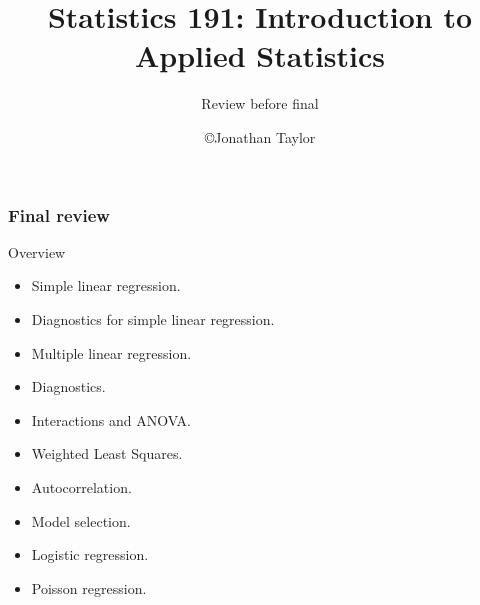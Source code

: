 \documentclass[handout]{beamer}
\title{Statistics 191: Introduction to Applied Statistics}
\subtitle{Review before final}
\author{\copyright Jonathan Taylor \\
   }
\begin{document}
   \begin{frame}
   \titlepage
   \end{frame}


   \begin{frame} \frametitle{Final review}

   \begin{block}
   {Overview}
   \begin{itemize}

   \item Simple linear regression.

   \item Diagnostics for simple linear regression.

   \item Multiple linear regression.

   \item Diagnostics.

   \item Interactions and ANOVA.

   \item Weighted Least Squares.

   \item Autocorrelation.

   \item Model selection.

   \item Logistic regression.

   \item Poisson regression.

   \end{itemize}
   \end{block}
   \end{frame}

\end{document}
